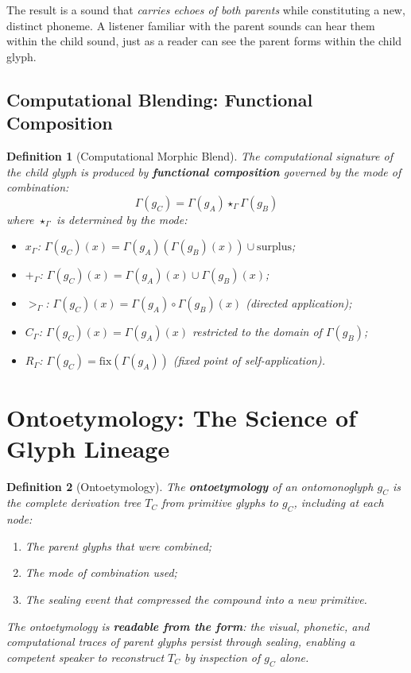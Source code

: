 \documentclass[12pt, letterpaper]{book}
\def\equiv{=}%
\def\otimes{x}%
\def\oplus{+}%
\def\triangleright{>}%
\def\subset{C}%
\def\circlearrowleft{R}%
\def\mathfrak#1{#1}%
\newtheorem{definition}{Definition}[chapter]
\begin{document}
The result is a sound that \textit{carries echoes of both parents} while constituting a new, distinct phoneme. A listener familiar with the parent sounds can hear them within the child sound, just as a reader can see the parent forms within the child glyph.


\subsection{Computational Blending: Functional Composition}

\begin{definition}[Computational Morphic Blend]\label{def:comp-blend}
The computational signature of the child glyph is produced by \textbf{functional composition} governed by the mode of combination:
\[
\Gamma(\mathfrak{g}_C) \equiv \Gamma(\mathfrak{g}_A) \star_\Gamma \Gamma(\mathfrak{g}_B)
\]
where $\star_\Gamma$ is determined by the mode:
\begin{itemize}
    \item $\otimes_\Gamma$: $\Gamma(\mathfrak{g}_C)(x) \equiv \Gamma(\mathfrak{g}_A)(\Gamma(\mathfrak{g}_B)(x)) \cup \mathrm{surplus}$;
    \item $\oplus_\Gamma$: $\Gamma(\mathfrak{g}_C)(x) \equiv \Gamma(\mathfrak{g}_A)(x) \cup \Gamma(\mathfrak{g}_B)(x)$;
    \item $\triangleright_\Gamma$: $\Gamma(\mathfrak{g}_C)(x) \equiv \Gamma(\mathfrak{g}_A) \circ \Gamma(\mathfrak{g}_B)(x)$ (directed application);
    \item $\subset_\Gamma$: $\Gamma(\mathfrak{g}_C)(x) \equiv \Gamma(\mathfrak{g}_A)(x)$ restricted to the domain of $\Gamma(\mathfrak{g}_B)$;
    \item $\circlearrowleft_\Gamma$: $\Gamma(\mathfrak{g}_C) \equiv \mathrm{fix}(\Gamma(\mathfrak{g}_A))$ (fixed point of self-application).
\end{itemize}
\end{definition}


\section{Ontoetymology: The Science of Glyph Lineage}

\begin{definition}[Ontoetymology]\label{def:ontoetymology}
The \textbf{ontoetymology} of an ontomonoglyph $\mathfrak{g}_C$ is the complete derivation tree $T_C$ from primitive glyphs to $\mathfrak{g}_C$, including at each node:
\begin{enumerate}[label=(\roman*)]
    \item The parent glyphs that were combined;
    \item The mode of combination used;
    \item The sealing event that compressed the compound into a new primitive.
\end{enumerate}
The ontoetymology is \textbf{readable from the form}: the visual, phonetic, and computational traces of parent glyphs persist through sealing, enabling a competent speaker to reconstruct $T_C$ by inspection of $\mathfrak{g}_C$ alone.
\end{definition}
\end{document}
